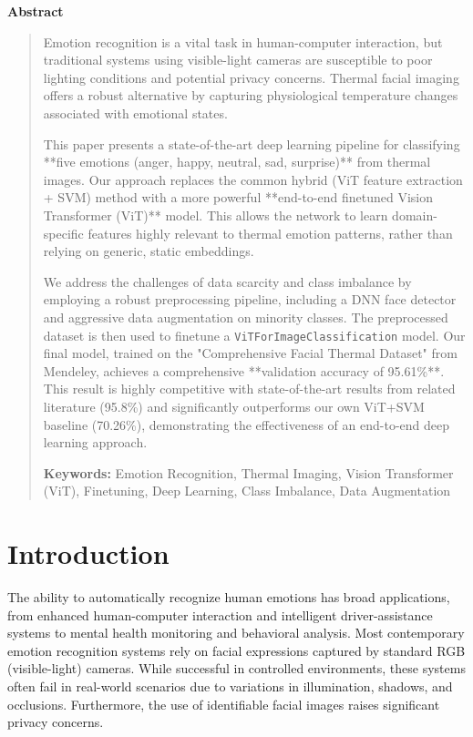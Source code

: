 \documentclass[12pt,a4paper]{report}
\renewenvironment{abstract}{%
  \begin{center}\bfseries\large Abstract\end{center}\begin{quotation}}{\end{quotation}}
\begin{document}
\begin{abstract}
\noindent
Emotion recognition is a vital task in human-computer interaction, but traditional systems using visible-light cameras are susceptible to poor lighting conditions and potential privacy concerns. Thermal facial imaging offers a robust alternative by capturing physiological temperature changes associated with emotional states.

This paper presents a state-of-the-art deep learning pipeline for classifying **five emotions (anger, happy, neutral, sad, surprise)** from thermal images. Our approach replaces the common hybrid (ViT feature extraction + SVM) method with a more powerful **end-to-end finetuned Vision Transformer (ViT)** model. This allows the network to learn domain-specific features highly relevant to thermal emotion patterns, rather than relying on generic, static embeddings.

We address the challenges of data scarcity and class imbalance by employing a robust preprocessing pipeline, including a DNN face detector and aggressive data augmentation on minority classes. The preprocessed dataset is then used to finetune a \texttt{ViTForImageClassification} model. Our final model, trained on the "Comprehensive Facial Thermal Dataset" from Mendeley, achieves a comprehensive **validation accuracy of 95.61\%**. This result is highly competitive with state-of-the-art results from related literature (95.8\%) and significantly outperforms our own ViT+SVM baseline (70.26\%), demonstrating the effectiveness of an end-to-end deep learning approach.

\vspace{1em}
\noindent\textbf{Keywords:} Emotion Recognition, Thermal Imaging, Vision Transformer (ViT), Finetuning, Deep Learning, Class Imbalance, Data Augmentation
\end{abstract}


\clearpage

\chapter{Introduction}
\label{sec:intro}
The ability to automatically recognize human emotions has broad applications, from enhanced human-computer interaction and intelligent driver-assistance systems to mental health monitoring and behavioral analysis. Most contemporary emotion recognition systems rely on facial expressions captured by standard RGB (visible-light) cameras. While successful in controlled environments, these systems often fail in real-world scenarios due to variations in illumination, shadows, and occlusions. Furthermore, the use of identifiable facial images raises significant privacy concerns.
\end{document}
